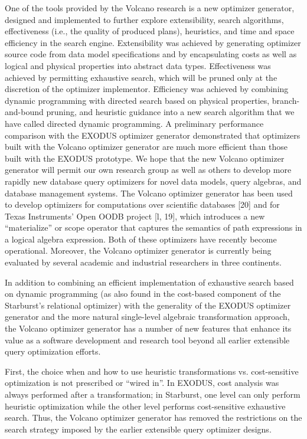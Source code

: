 \documentclass[a4paper,12pt,notitlepage,twoside,openright]{article}
\begin{document}
One of the tools provided by the Volcano research is a new optimizer
generator, designed and implemented to further explore extensibility,
search algorithms, effectiveness (i.e., the quality of produced plans),
heuristics, and time and space efficiency in the search engine.
Extensibility was achieved by generating optimizer source code from data
model specifications and by encapsulating costs as well as logical and
physical properties into abstract data types. Effectiveness was achieved
by permitting exhaustive search, which will be pruned only at the
discretion of the optimizer implementor. Efficiency was achieved by
combining dynamic programming with directed search based on physical
properties, branch-and-bound pruning, and heuristic guidance into a new
search algorithm that we have called directed dynamic programming. A
preliminary performance comparison with the EXODUS optimizer generator
demonstrated that optimizers built with the Volcano optimizer generator
are much more efficient than those built with the EXODUS prototype. We
hope that the new Volcano optimizer generator will permit our own
research group as well as others to develop more rapidly new database
query optimizers for novel data models, query algebras, and database
management systems. The Volcano optimizer generator has been used to
develop optimizers for computations over scientific databases {[}20{]}
and for Texas Instruments' Open OODB project {[}l, 19{]}, which
introduces a new ``materialize'' or scope operator that captures the
semantics of path expressions in a logical algebra expression. Both of
these optimizers have recently become operational. Moreover, the Volcano
optimizer generator is currently being evaluated by several academic and
industrial researchers in three continents.

In addition to combining an efficient implementation of exhaustive
search based on dynamic programming (as also found in the cost-based
component of the Starburst's relational optimizer) with the generality
of the EXODUS optimizer generator and the more natural single-level
algebraic transformation approach, the Volcano optimizer generator has a
number of new features that enhance its value as a software development
and research tool beyond all earlier extensible query optimization
efforts.

First, the choice when and how to use heuristic transformations vs.
cost-sensitive optimization is not prescribed or ``wired in''. In EXODUS,
cost analysis was always performed after a transformation; in Starburst,
one level can only perform heuristic optimization while the other level
performs cost-sensitive exhaustive search. Thus, the Volcano optimizer
generator has removed the restrictions on the search strategy imposed by
the earlier extensible query optimizer designs.
\end{document}
